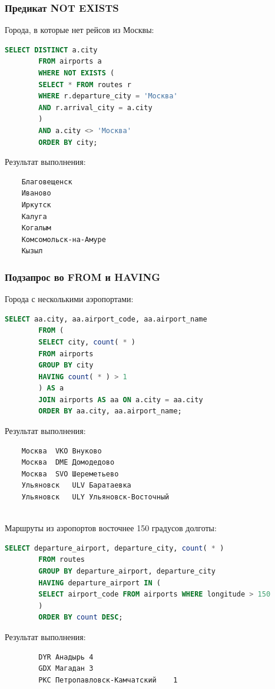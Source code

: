 \documentclass{bmstu-sob}
\begin{document}
	\subsubsection{Предикат NOT EXISTS}
	Города, в которые нет рейсов из Москвы:
	\begin{lstlisting}[language=SQL]
		SELECT DISTINCT a.city
		FROM airports a
		WHERE NOT EXISTS (
		SELECT * FROM routes r
		WHERE r.departure_city = 'Москва'
		AND r.arrival_city = a.city
		)
		AND a.city <> 'Москва'
		ORDER BY city;
	\end{lstlisting}
	Результат выполнения:
	\begin{lstlisting}
	Благовещенск
	Иваново
	Иркутск
	Калуга
	Когалым
	Комсомольск-на-Амуре
	Кызыл
	\end{lstlisting}
	
	\subsubsection{Подзапрос во FROM и HAVING}
	Города с несколькими аэропортами:
	\begin{lstlisting}[language=SQL]
		SELECT aa.city, aa.airport_code, aa.airport_name
		FROM (
		SELECT city, count( * )
		FROM airports
		GROUP BY city
		HAVING count( * ) > 1
		) AS a
		JOIN airports AS aa ON a.city = aa.city
		ORDER BY aa.city, aa.airport_name;
	\end{lstlisting}
	Результат выполнения:
	\begin{lstlisting}
	Москва	VKO	Внуково
	Москва	DME	Домодедово
	Москва	SVO	Шереметьево
	Ульяновск	ULV	Баратаевка
	Ульяновск	ULY	Ульяновск-Восточный
	
	\end{lstlisting}
	
	Маршруты из аэропортов восточнее 150 градусов долготы:
	\begin{lstlisting}[language=SQL]
		SELECT departure_airport, departure_city, count( * )
		FROM routes
		GROUP BY departure_airport, departure_city
		HAVING departure_airport IN (
		SELECT airport_code FROM airports WHERE longitude > 150
		)
		ORDER BY count DESC;
	\end{lstlisting}
	Результат выполнения:
	\begin{lstlisting}
		DYR	Анадырь	4
		GDX	Магадан	3
		PKC	Петропавловск-Камчатский	1
		
	\end{lstlisting}
	
\end{document}
